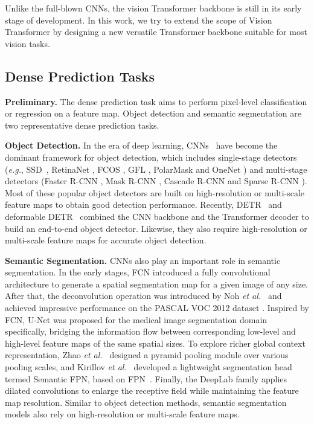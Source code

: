 \documentclass[10pt,twocolumn,letterpaper]{article}
\def\eg{\emph{e.g.}}
\def\etal{{\em et al.~}}
\begin{document}
Unlike the full-blown CNNs, the vision Transformer backbone is still in its early stage of development. In this work, we try to extend the scope of Vision Transformer by designing a new versatile Transformer backbone suitable for most vision tasks.


\subsection{Dense Prediction Tasks}

%
\textbf{Preliminary.} The dense prediction task aims to perform pixel-level classification or regression on a feature map.
Object detection and semantic segmentation are two representative dense prediction tasks.

\textbf{Object Detection.} In the era of deep learning, CNNs~\cite{lecun1998gradient} have become the dominant framework for object detection, which includes single-stage detectors (\eg, SSD~\cite{liu2016ssd}, RetinaNet \cite{lin2017focal}, FCOS \cite{tian2019fcos}, GFL \cite{li2020generalized,li2020generalizedv2}, PolarMask \cite{xie2020polarmask} and OneNet \cite{sun2020onenet}) and multi-stage detectors (Faster R-CNN \cite{ren2015faster}, Mask R-CNN \cite{he2017mask}, Cascade R-CNN \cite{cai2018cascade} and Sparse R-CNN \cite{sun2020sparse}).
%
Most of these popular object detectors are built on high-resolution or multi-scale feature maps to obtain good detection performance.
%
Recently, DETR~\cite{carion2020end} and deformable DETR~\cite{zhu2020deformable} combined the CNN backbone and the Transformer decoder to build an end-to-end object detector.
Likewise, they also require high-resolution or multi-scale feature maps for accurate object detection.
%

\textbf{Semantic Segmentation.} CNNs also play an important role in semantic segmentation.
%
In the early stages, FCN \cite{long2015fully} introduced a fully convolutional architecture to generate a spatial segmentation map for a given image of any size.
%
After that, the deconvolution operation was introduced by Noh \etal\cite{noh2015learning} and achieved impressive performance on the PASCAL VOC 2012 dataset \cite{shetty2016application}.
%
Inspired by FCN, U-Net \cite{ronneberger2015u} was proposed for the medical image segmentation domain specifically, bridging the information flow between corresponding low-level and high-level feature maps of the same spatial sizes. 
%
To explore richer global context representation, Zhao \etal\cite{zhao2017pyramid} designed a pyramid pooling module over various pooling scales, and Kirillov \etal\cite{kirillov2019panoptic} developed a lightweight segmentation head termed Semantic FPN, based on FPN~\cite{lin2017feature}.
%
Finally, the DeepLab family \cite{chen2017deeplab,liu2019auto} applies dilated convolutions to enlarge the receptive field while maintaining the feature map resolution.
%
%
Similar to object detection methods, semantic segmentation models also rely on high-resolution or multi-scale feature maps.
%
\end{document}

